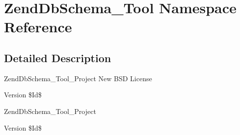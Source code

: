 \hypertarget{namespaceZendDbSchema__Tool}{\section{\-Zend\-Db\-Schema\-\_\-\-Tool \-Namespace \-Reference}
\label{namespaceZendDbSchema__Tool}
}


\subsection{\-Detailed \-Description}
\-Zend\-Db\-Schema\-\_\-\-Tool\-\_\-\-Project  \-New \-B\-S\-D \-License \begin{DoxyVersion}{\-Version}
\$\-Id\$
\end{DoxyVersion}
\-Zend\-Db\-Schema\-\_\-\-Tool\-\_\-\-Project \begin{DoxyVersion}{\-Version}
\$\-Id\$ 
\end{DoxyVersion}
